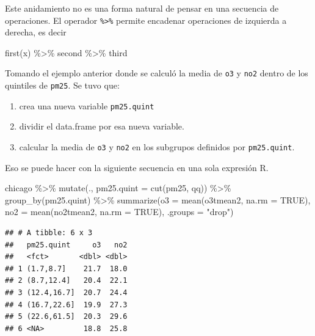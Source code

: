 \documentclass[
]{book}
\newenvironment{Shaded}{\begin{snugshade}}{\end{snugshade}}
\newcommand{\AttributeTok}[1]{\textcolor[rgb]{0.77,0.63,0.00}{#1}}
\newcommand{\ConstantTok}[1]{\textcolor[rgb]{0.00,0.00,0.00}{#1}}
\newcommand{\FunctionTok}[1]{\textcolor[rgb]{0.00,0.00,0.00}{#1}}
\newcommand{\NormalTok}[1]{#1}
\newcommand{\SpecialCharTok}[1]{\textcolor[rgb]{0.00,0.00,0.00}{#1}}
\newcommand{\StringTok}[1]{\textcolor[rgb]{0.31,0.60,0.02}{#1}}
\providecommand{\tightlist}{%
  \setlength{\itemsep}{0pt}\setlength{\parskip}{0pt}}
\begin{document}
Este anidamiento no es una forma natural de pensar en una secuencia de operaciones. El operador \texttt{\%\textgreater{}\%} permite encadenar operaciones de izquierda a derecha, es decir

\begin{Shaded}
\begin{Highlighting}[]
\FunctionTok{first}\NormalTok{(x) }\SpecialCharTok{\%\textgreater{}\%}\NormalTok{ second }\SpecialCharTok{\%\textgreater{}\%}\NormalTok{ third}
\end{Highlighting}
\end{Shaded}

Tomando el ejemplo anterior donde se calculó la media de \texttt{o3} y \texttt{no2} dentro de los quintiles de \texttt{pm25}. Se tuvo que:

\begin{enumerate}
\def\labelenumi{\arabic{enumi}.}
\tightlist
\item
  crea una nueva variable \texttt{pm25.quint}
\item
  dividir el data.frame por esa nueva variable.
\item
  calcular la media de \texttt{o3} y \texttt{no2} en los subgrupos definidos por \texttt{pm25.quint}.
\end{enumerate}

Eso se puede hacer con la siguiente secuencia en una sola expresión R.

\begin{Shaded}
\begin{Highlighting}[]
\NormalTok{chicago }\SpecialCharTok{\%\textgreater{}\%} 
  \FunctionTok{mutate}\NormalTok{(., }\AttributeTok{pm25.quint =} \FunctionTok{cut}\NormalTok{(pm25, qq)) }\SpecialCharTok{\%\textgreater{}\%}    
   \FunctionTok{group\_by}\NormalTok{(pm25.quint) }\SpecialCharTok{\%\textgreater{}\%} 
    \FunctionTok{summarize}\NormalTok{(}\AttributeTok{o3 =} \FunctionTok{mean}\NormalTok{(o3tmean2, }\AttributeTok{na.rm =} \ConstantTok{TRUE}\NormalTok{), }
               \AttributeTok{no2 =} \FunctionTok{mean}\NormalTok{(no2tmean2, }\AttributeTok{na.rm =} \ConstantTok{TRUE}\NormalTok{),}
                \AttributeTok{.groups =} \StringTok{"drop"}\NormalTok{)}
\end{Highlighting}
\end{Shaded}

\begin{verbatim}
## # A tibble: 6 x 3
##   pm25.quint     o3   no2
##   <fct>       <dbl> <dbl>
## 1 (1.7,8.7]    21.7  18.0
## 2 (8.7,12.4]   20.4  22.1
## 3 (12.4,16.7]  20.7  24.4
## 4 (16.7,22.6]  19.9  27.3
## 5 (22.6,61.5]  20.3  29.6
## 6 <NA>         18.8  25.8
\end{verbatim}
\end{document}
